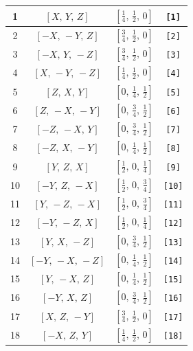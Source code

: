 \documentclass[fleqn,8pt]{jsarticle}
\begin{document}
\begin{longtable}{cccc}
1 & $\left[ X,\, Y,\, Z \right]$ & $\left[ \frac{1}{4},\, \frac{1}{2},\, 0 \right]$ & {\tt [1]} \\ \hline
2 & $\left[ - X,\, - Y,\, Z \right]$ & $\left[ \frac{3}{4},\, \frac{1}{2},\, 0 \right]$ & {\tt [2]} \\ \hline
3 & $\left[ - X,\, Y,\, - Z \right]$ & $\left[ \frac{3}{4},\, \frac{1}{2},\, 0 \right]$ & {\tt [3]} \\ \hline
4 & $\left[ X,\, - Y,\, - Z \right]$ & $\left[ \frac{1}{4},\, \frac{1}{2},\, 0 \right]$ & {\tt [4]} \\ \hline
5 & $\left[ Z,\, X,\, Y \right]$ & $\left[ 0,\, \frac{1}{4},\, \frac{1}{2} \right]$ & {\tt [5]} \\ \hline
6 & $\left[ Z,\, - X,\, - Y \right]$ & $\left[ 0,\, \frac{3}{4},\, \frac{1}{2} \right]$ & {\tt [6]} \\ \hline
7 & $\left[ - Z,\, - X,\, Y \right]$ & $\left[ 0,\, \frac{3}{4},\, \frac{1}{2} \right]$ & {\tt [7]} \\ \hline
8 & $\left[ - Z,\, X,\, - Y \right]$ & $\left[ 0,\, \frac{1}{4},\, \frac{1}{2} \right]$ & {\tt [8]} \\ \hline
9 & $\left[ Y,\, Z,\, X \right]$ & $\left[ \frac{1}{2},\, 0,\, \frac{1}{4} \right]$ & {\tt [9]} \\ \hline
10 & $\left[ - Y,\, Z,\, - X \right]$ & $\left[ \frac{1}{2},\, 0,\, \frac{3}{4} \right]$ & {\tt [10]} \\ \hline
11 & $\left[ Y,\, - Z,\, - X \right]$ & $\left[ \frac{1}{2},\, 0,\, \frac{3}{4} \right]$ & {\tt [11]} \\ \hline
12 & $\left[ - Y,\, - Z,\, X \right]$ & $\left[ \frac{1}{2},\, 0,\, \frac{1}{4} \right]$ & {\tt [12]} \\ \hline
13 & $\left[ Y,\, X,\, - Z \right]$ & $\left[ 0,\, \frac{3}{4},\, \frac{1}{2} \right]$ & {\tt [13]} \\ \hline
14 & $\left[ - Y,\, - X,\, - Z \right]$ & $\left[ 0,\, \frac{1}{4},\, \frac{1}{2} \right]$ & {\tt [14]} \\ \hline
15 & $\left[ Y,\, - X,\, Z \right]$ & $\left[ 0,\, \frac{1}{4},\, \frac{1}{2} \right]$ & {\tt [15]} \\ \hline
16 & $\left[ - Y,\, X,\, Z \right]$ & $\left[ 0,\, \frac{3}{4},\, \frac{1}{2} \right]$ & {\tt [16]} \\ \hline
17 & $\left[ X,\, Z,\, - Y \right]$ & $\left[ \frac{3}{4},\, \frac{1}{2},\, 0 \right]$ & {\tt [17]} \\ \hline
18 & $\left[ - X,\, Z,\, Y \right]$ & $\left[ \frac{1}{4},\, \frac{1}{2},\, 0 \right]$ & {\tt [18]} \\ \hline

\end{longtable}
\end{document}
